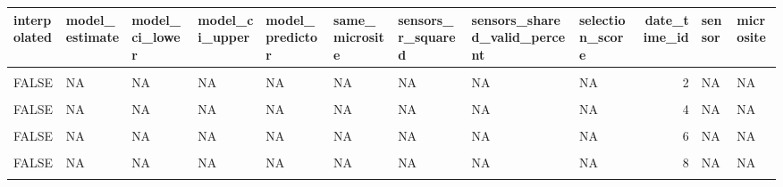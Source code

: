 \documentclass[]{article}
\begin{document}
\begin{table}[H]
\centering
\begin{tabular}[t]{l|l|l|l|l|l|l|l|l|r|l|l}
\hline
interpolated & model\_estimate & model\_ci\_lower & model\_ci\_upper & model\_predictor & same\_microsite & sensors\_r\_squared & sensors\_shared\_valid\_percent & selection\_score & date\_time\_id & sensor & microsite\\
\hline
\cellcolor{gray!6}{FALSE} & \cellcolor{gray!6}{NA} & \cellcolor{gray!6}{NA} & \cellcolor{gray!6}{NA} & \cellcolor{gray!6}{NA} & \cellcolor{gray!6}{NA} & \cellcolor{gray!6}{NA} & \cellcolor{gray!6}{NA} & \cellcolor{gray!6}{NA} & \cellcolor{gray!6}{1} & \cellcolor{gray!6}{NA} & \cellcolor{gray!6}{NA}\\
\hline
FALSE & NA & NA & NA & NA & NA & NA & NA & NA & 2 & NA & NA\\
\hline
\cellcolor{gray!6}{FALSE} & \cellcolor{gray!6}{NA} & \cellcolor{gray!6}{NA} & \cellcolor{gray!6}{NA} & \cellcolor{gray!6}{NA} & \cellcolor{gray!6}{NA} & \cellcolor{gray!6}{NA} & \cellcolor{gray!6}{NA} & \cellcolor{gray!6}{NA} & \cellcolor{gray!6}{3} & \cellcolor{gray!6}{NA} & \cellcolor{gray!6}{NA}\\
\hline
FALSE & NA & NA & NA & NA & NA & NA & NA & NA & 4 & NA & NA\\
\hline
\cellcolor{gray!6}{FALSE} & \cellcolor{gray!6}{NA} & \cellcolor{gray!6}{NA} & \cellcolor{gray!6}{NA} & \cellcolor{gray!6}{NA} & \cellcolor{gray!6}{NA} & \cellcolor{gray!6}{NA} & \cellcolor{gray!6}{NA} & \cellcolor{gray!6}{NA} & \cellcolor{gray!6}{5} & \cellcolor{gray!6}{NA} & \cellcolor{gray!6}{NA}\\
\hline
FALSE & NA & NA & NA & NA & NA & NA & NA & NA & 6 & NA & NA\\
\hline
\cellcolor{gray!6}{FALSE} & \cellcolor{gray!6}{NA} & \cellcolor{gray!6}{NA} & \cellcolor{gray!6}{NA} & \cellcolor{gray!6}{NA} & \cellcolor{gray!6}{NA} & \cellcolor{gray!6}{NA} & \cellcolor{gray!6}{NA} & \cellcolor{gray!6}{NA} & \cellcolor{gray!6}{7} & \cellcolor{gray!6}{NA} & \cellcolor{gray!6}{NA}\\
\hline
FALSE & NA & NA & NA & NA & NA & NA & NA & NA & 8 & NA & NA\\
\hline
\cellcolor{gray!6}{FALSE} & \cellcolor{gray!6}{NA} & \cellcolor{gray!6}{NA} & \cellcolor{gray!6}{NA} & \cellcolor{gray!6}{NA} & \cellcolor{gray!6}{NA} & \cellcolor{gray!6}{NA} & \cellcolor{gray!6}{NA} & \cellcolor{gray!6}{NA} & \cellcolor{gray!6}{9} & \cellcolor{gray!6}{NA} & \cellcolor{gray!6}{NA}\\

\end{tabular}
\end{table}
\end{document}
